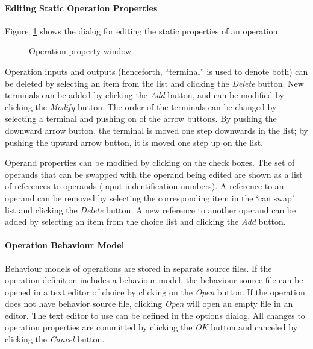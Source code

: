 \documentclass[twoside]{tceusermanual}
\begin{document}
\paragraph{Editing Static Operation Properties}

Figure~\ref{fig:osed_operation_window} shows the dialog for editing the
static properties of an operation. 
 
\begin{figure}[tb]
\centerline{}
\caption{Operation property window}
\label{fig:osed_operation_window}
\end{figure}

Operation inputs and outputs (henceforth, ``terminal'' is used to denote both)
can be deleted by selecting an item from the list and clicking the \emph{Delete}
button. New terminals can be added
by clicking the \emph{Add} button, and can be modified by clicking the \emph{Modify}
button. The order of the terminals can be changed by selecting a terminal
and pushing on of the arrow buttons. By pushing the downward arrow button, the
terminal is moved one step downwards in the list; by pushing the upward arrow
button, it is moved one step up on the list.

Operand properties can be modified by clicking on the check boxes. The set
of operands that can be swapped with the operand being edited are shown as a
list of references to operands (input indentification numbers).  A reference
to an operand can be removed by selecting the corresponding item in the `can
swap' list and clicking the \emph{Delete} button.  A new reference to another
operand can be added by selecting an item from the choice list and clicking
the \emph{Add} button.

\paragraph{Operation Behaviour Model}

Behaviour models of operations are stored in separate source files.  If the
operation definition includes a behaviour model, the behaviour source file
can be opened in a text editor of choice by clicking on the \emph{Open}
button. If the operation does not have behavior source file, clicking
\emph{Open} will open an empty file in an editor. The text editor to use can
be defined in the options dialog. All changes to operation properties are 
committed by clicking the \emph{OK} button and canceled by clicking the \emph{Cancel} 
button.
\end{document}
